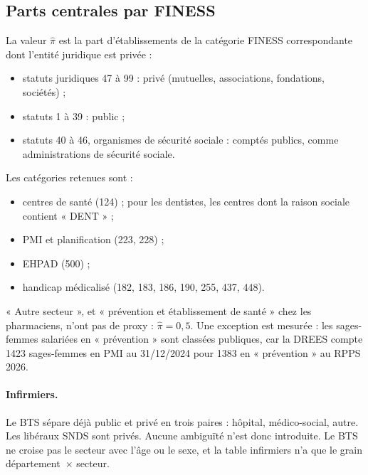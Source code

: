 \documentclass[11pt]{article}
\begin{document}
\subsection{Parts centrales par FINESS}
La valeur $\hat\pi$ est la part d'établissements de la catégorie FINESS correspondante dont l'entité juridique est
privée :
\begin{itemize}
  \item statuts juridiques 47 à 99 : privé (mutuelles, associations, fondations, sociétés) ;
  \item statuts 1 à 39 : public ;
  \item statuts 40 à 46, organismes de sécurité sociale : comptés publics, comme administrations de sécurité
  sociale.
\end{itemize}
Les catégories retenues sont :
\begin{itemize}
  \item centres de santé (124) ; pour les dentistes, les centres dont la raison sociale contient « DENT » ;
  \item PMI et planification (223, 228) ;
  \item EHPAD (500) ;
  \item handicap médicalisé (182, 183, 186, 190, 255, 437, 448).
\end{itemize}
« Autre secteur », et « prévention et établissement de santé » chez les pharmaciens, n'ont pas de proxy :
$\hat\pi = 0{,}5$\suppose{}. Une exception est mesurée : les sages-femmes salariées en « prévention » sont
classées publiques, car la DREES compte \num{1423} sages-femmes en PMI au 31/12/2024 pour \num{1383} en
« prévention » au RPPS 2026\mesure{}.

\paragraph{Infirmiers.} Le BTS sépare déjà public et privé en trois paires : hôpital, médico-social, autre. Les
libéraux SNDS sont privés. Aucune ambiguïté n'est donc introduite. Le BTS ne croise pas le secteur avec l'âge ou
le sexe, et la table infirmiers n'a que le grain département~$\times$ secteur.
\end{document}
